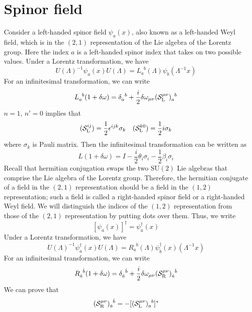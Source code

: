 \section{Spinor field}
Consider a left-handed spinor field $\psi_a(x)$, also known as a left-handed Weyl field, which is in the $(2,1)$ representation of the Lie algebra of the Lorentz group. Here the index $a$ is a left-handed spinor index that takes on two possible values. Under a Lorentz transformation, we have
\[U(\Lambda)^{-1} \psi_a(x) U(\Lambda) = L_a^{\phantom{a}b}(\Lambda) \psi_b(\Lambda^{-1}x)\]
For an infinitesimal transformation, we can write
\[L_a^{\phantom{a}b}(1+\delta \omega) = \delta_a^{\phantom{a}b} + \frac{i}{2} \delta \omega_{\mu \nu} (\mathcal{S}_{\rm L}^{\mu \nu})_a^{\phantom{a}b}\]
$n=1,\, n'=0$  implies that
\[(\mathcal{S}_{\rm L}^{i j}) = \frac{1}{2}\epsilon^{ijk}\sigma_k \quad  (\mathcal{S}_{\rm L}^{k 0}) = \frac{1}{2}i\sigma_k\]
where $\sigma_k$ is Pauli matrix.
Then the infinitesimal transformation can be written as
\[L(1+\delta \omega) = I - \frac{i}{2} \theta_i \sigma_i -\frac{1}{2} \beta_i \sigma_i\]
Recall that hermitian conjugation swaps the two $\mathrm{SU}(2)$ Lie
algebras that comprise the Lie algebra of the Lorentz group.
Therefore, the hermitian conjugate of a field in the $(2,1)$ representation should be a field in the $(1,2)$ representation; such a field is called a right-handed spinor field or a right-handed Weyl field. We will distinguish the indices of the $(1,2)$ representation from those of the $(2,1)$ representation by putting dots over them. Thus, we write
\[[\psi_a(x)]^{\dagger} = \psi^{\dagger}_{\dot{a}}(x)\]
Under a Lorentz transformation, we have
\[U(\Lambda)^{-1} \psi^{\dagger}_{\dot{a}}(x) U(\Lambda) = R_{\dot{a}}^{\phantom{a}\dot{b}}(\Lambda) \psi^{\dagger}_{\dot{b}}(x)(\Lambda^{-1}x)\]
For an infinitesimal transformation, we can write
\[R_{\dot{a}}^{\phantom{a}\dot{b}}(1+\delta \omega) = \delta_{\dot{a}}^{\phantom{a}\dot{b}} + \frac{i}{2} \delta \omega_{\mu \nu} (\mathcal{S}_{\rm R}^{\mu \nu})_{\dot{a}}^{\phantom{a}\dot{b}}\]
We can prove that
\[(\mathcal{S}_{\rm R}^{\mu \nu})_{\dot{a}}^{\phantom{a}\dot{b}} = -[(\mathcal{S}_{\rm L}^{\mu \nu})_a^{\phantom{a}b}]^*\]

